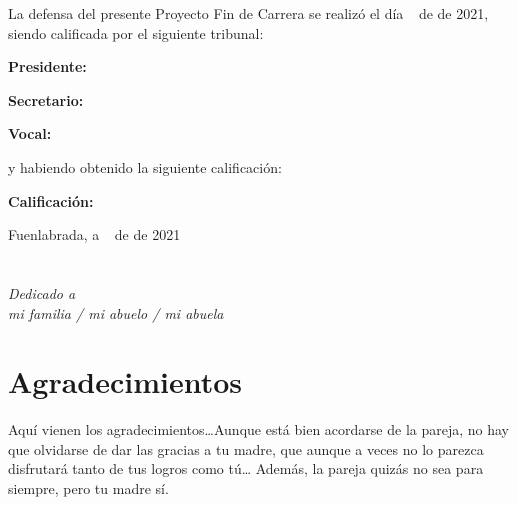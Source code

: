 \documentclass[a4paper, 12pt]{book}
\begin{document}
\vspace{1cm}
La defensa del presente Proyecto Fin de Carrera se realizó el día \qquad$\;\,$ de \qquad\qquad\qquad\qquad \newline de 2021, siendo calificada por el siguiente tribunal:


\vspace{0.5cm}
\textbf{Presidente:}

\vspace{1.2cm}
\textbf{Secretario:}

\vspace{1.2cm}
\textbf{Vocal:}


\vspace{1.2cm}
y habiendo obtenido la siguiente calificación:

\vspace{1cm}
\textbf{Calificación:}


\vspace{1cm}
\begin{flushright}
Fuenlabrada, a \qquad$\;\,$ de \qquad\qquad\qquad\qquad de 2021
\end{flushright}


\chapter*{}
\begin{flushright}
\textit{Dedicado a \\
mi familia / mi abuelo / mi abuela}
\end{flushright}


\chapter*{Agradecimientos}

Aquí vienen los agradecimientos\ldots Aunque está bien acordarse de la pareja, no hay que olvidarse de dar las gracias a tu madre, que aunque a veces no lo parezca disfrutará tanto de tus logros como tú\ldots 
Además, la pareja quizás no sea para siempre, pero tu madre sí.
\end{document}
